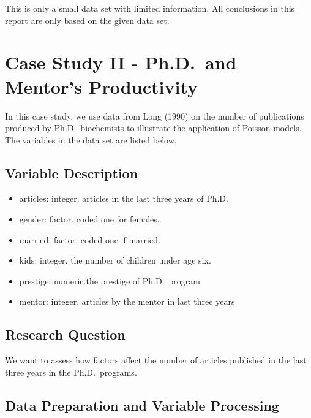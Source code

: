 \documentclass[
]{book}
\providecommand{\tightlist}{%
  \setlength{\itemsep}{0pt}\setlength{\parskip}{0pt}}
\begin{document}
This is only a small data set with limited information. All conclusions in this report are only based on the given data set.

\hypertarget{case-study-ii---ph.d.-and-mentors-productivity}{%
\section{Case Study II - Ph.D.~and Mentor's Productivity}\label{case-study-ii---ph.d.-and-mentors-productivity}}

In this case study, we use data from Long (1990) on the number of publications produced by Ph.D.~biochemists to illustrate the application of Poisson models. The variables in the data set are listed below.

\hypertarget{variable-description}{%
\subsection{Variable Description}\label{variable-description}}

\begin{itemize}
\tightlist
\item
  articles: integer. articles in the last three years of Ph.D.
\item
  gender: factor. coded one for females.
\item
  married: factor. coded one if married.
\item
  kids: integer. the number of children under age six.
\item
  prestige: numeric.the prestige of Ph.D.~program
\item
  mentor: integer. articles by the mentor in last three years
\end{itemize}

\hypertarget{research-question-2}{%
\subsection{Research Question}\label{research-question-2}}

We want to assess how factors affect the number of articles published in the last three years in the Ph.D.~programs.

\hfill\break

\hypertarget{data-preparation-and-variable-processing}{%
\subsection{Data Preparation and Variable Processing}\label{data-preparation-and-variable-processing}}
\end{document}
